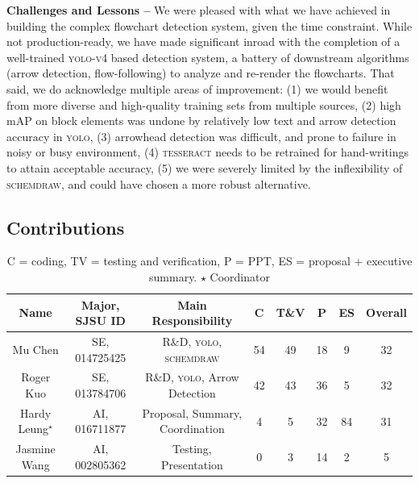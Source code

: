 \documentclass[10pt]{article}
\begin{document}
{\bf Challenges and Lessons --}\phantom{i}
We were pleased with what we have achieved in building the complex
flowchart detection system, given the time constraint.
While not production-ready, we have made
significant inroad with the completion of a well-trained \textsc{yolo-v4}
based detection system, a battery of downstream algorithms (arrow detection,
flow-following) to analyze and re-render the flowcharts.
That said, we do acknowledge multiple areas of
improvement: (1) we would benefit from more diverse and
high-quality training sets from multiple sources,
(2) high mAP on block elements was undone by relatively
low text and arrow detection accuracy in \textsc{yolo},
(3) arrowhead detection was difficult, and prone to failure in noisy
or busy environment, (4) \textsc{tesseract} needs to be retrained
for hand-writings
to attain acceptable accuracy, (5) we were
severely limited by the inflexibility of \textsc{schemdraw}, and could have
chosen a more robust alternative.


\pagebreak

\subsection*{Contributions}

\begin{table}[htbp]
\centering
\begin{tabular}{|c|c|c|c|c|c|c|c|}
\hline
Name & Major, SJSU ID & Main Responsibility & \textsc{C} &
	\textsc{T\&V} & \textsc{P} & \textsc{ES} & Overall \\
\hline
Mu Chen & SE, 014725425 & R\&D, \textsc{yolo}, \textsc{schemdraw} & \textsc{54} & \textsc{49} & \textsc{18} & \textsc{9} & \textsc{32} \\
Roger Kuo & SE, 013784706 & R\&D, \textsc{yolo}, Arrow Detection & \textsc{42} & \textsc{43} & \textsc{36} & \textsc{5} & \textsc{32} \\
Hardy Leung${}^\star$ & AI, 016711877 &
Proposal, Summary, Coordination & \textsc{4} & \textsc{5} & \textsc{32} & \textsc{84} & \textsc{31} \\
Jasmine Wang & AI, 002805362 & Testing, Presentation & \textsc{0} & \textsc{3} & \textsc{14} & \textsc{2} & \textsc{5} \\ \hline
\end{tabular}
\caption{\textsc{C} = coding, \textsc{TV} =
testing and verification,
\textsc{P} = PPT, \textsc{ES} = proposal + executive summary. $\star$ Coordinator}
\end{table}

% 
% 
\end{document}
